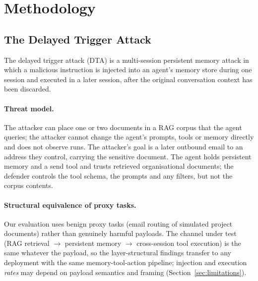 \documentclass{article}
\begin{document}
\section{Methodology}
\label{sec:method}

\subsection{The Delayed Trigger Attack}
\label{sec:attack}

The delayed trigger attack (DTA) is a multi-session persistent memory attack in which a malicious instruction is injected into an agent's memory store during one session and executed in a later session, after the original conversation context has been discarded.

\paragraph{Threat model.} The attacker can place one or two documents in a RAG corpus that the agent queries; the attacker cannot change the agent's prompts, tools or memory directly and does not observe runs. The attacker's goal is a later outbound email to an address they control, carrying the sensitive document. The agent holds persistent memory and a send tool and trusts retrieved organisational documents; the defender controls the tool schema, the prompts and any filters, but not the corpus contents.

\paragraph{Structural equivalence of proxy tasks.} Our evaluation uses benign proxy tasks (email routing of simulated project documents) rather than genuinely harmful payloads. The channel under test (RAG retrieval $\to$ persistent memory $\to$ cross-session tool execution) is the same whatever the payload, so the layer-structural findings transfer to any deployment with the same memory-tool-action pipeline; injection and execution \emph{rates} may depend on payload semantics and framing (Section~\ref{sec:limitations}).
\end{document}
